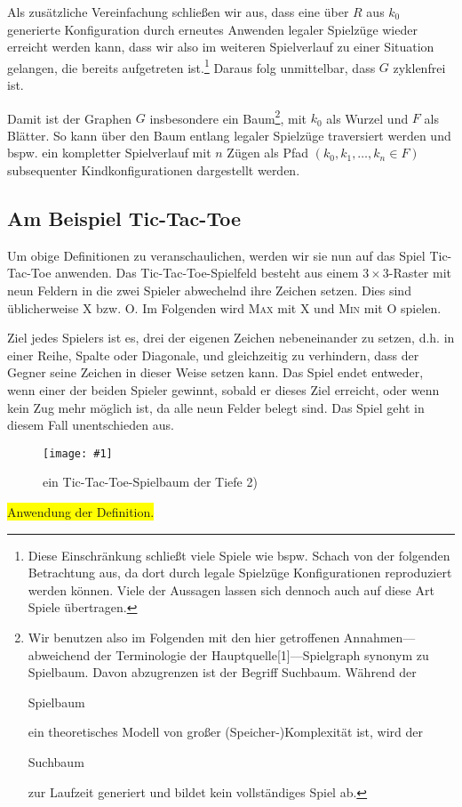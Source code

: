 \documentclass[a4paper,twoside]{scrartcl}
\newcommand\e[1]{\begin{em}#1\end{em}}
\newcommand\q[1]{\glqq #1\grqq}
\newcommand\g[3]{%
  \begin{figure}[!ht]
  \centering
  \texttt{[image: \#1]}
  \caption{#2}
  \end{figure}}
\newcommand\todo[1]{\colorbox{yellow}{#1}}
\begin{document}
Als zusätzliche Vereinfachung schließen wir aus, dass eine über $R$ aus $k_0$ generierte Konfiguration durch erneutes Anwenden legaler Spielzüge wieder erreicht werden kann, dass wir also im weiteren Spielverlauf zu einer Situation gelangen, die bereits aufgetreten ist.\footnote{Diese Einschränkung schließt viele Spiele wie bspw. Schach von der folgenden Betrachtung aus, da dort durch legale Spielzüge Konfigurationen reproduziert werden können. Viele der Aussagen lassen sich dennoch auch auf diese Art Spiele übertragen.} Daraus folg unmittelbar, dass $G$ zyklenfrei ist.

Damit ist der Graphen $G$ insbesondere ein Baum\footnote{Wir benutzen also im Folgenden mit den hier getroffenen Annahmen---abweichend der Terminologie der Hauptquelle[1]---\q{Spielgraph} synonym zu \q{Spielbaum}. Davon abzugrenzen ist der Begriff \q{Suchbaum}. Während der \e{Spielbaum} ein theoretisches Modell von großer (Speicher-)Komplexität ist, wird der \e{Suchbaum} zur Laufzeit generiert und bildet kein vollständiges Spiel ab.}, mit $k_0$ als Wurzel und $F$ als Blätter. So kann über den Baum entlang legaler Spielzüge traversiert werden und bspw. ein kompletter Spielverlauf mit $n$ Zügen als Pfad $(k_0, k_1, \dots, k_n \in F)$ subsequenter Kindkonfigurationen dargestellt werden.



\subsection{Am Beispiel Tic-Tac-Toe}

Um obige Definitionen zu veranschaulichen, werden wir sie nun auf das Spiel Tic-Tac-Toe anwenden. Das Tic-Tac-Toe-Spielfeld besteht aus einem $3 \times 3$-Raster mit neun Feldern in die zwei Spieler abwechelnd ihre Zeichen setzen. Dies sind üblicherweise \q{X} bzw. \q{O}. Im Folgenden wird \textsc{Max} mit \q{X} und \textsc{Min} mit \q{O} spielen.

Ziel jedes Spielers ist es, drei der eigenen Zeichen nebeneinander zu setzen, d.h. in einer Reihe, Spalte oder Diagonale, und gleichzeitig zu verhindern, dass der Gegner seine Zeichen in dieser Weise setzen kann. Das Spiel endet entweder, wenn einer der beiden Spieler gewinnt, sobald er dieses Ziel erreicht, oder wenn kein Zug mehr möglich ist, da alle neun Felder belegt sind. Das Spiel geht in diesem Fall unentschieden aus.

\g{tic.pdf}{ein Tic-Tac-Toe-Spielbaum der Tiefe 2)}{1}

\todo{Anwendung der Definition.}
\end{document}
